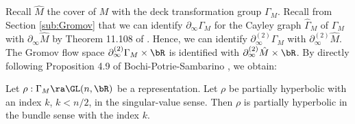 Recall $\hat M$ the cover of $M$ with the deck transformation group $\Gamma_M$. 
Recall from Section \ref{sub:Gromov}  that we can identify $\partial_\infty \Gamma_M$ for the Cayley graph $\hat \Gamma_M$ of $\Gamma_M$ with 
$\partial_\infty \hat M$ by Theorem 11.108 of \cite{DK2018}. 
Hence, we can identify $\partial_\infty^{(2)} \Gamma_M$ with $\partial^{(2)}_\infty \hat M$. 
The Gromov flow space $\partial_\infty^{(2)} \Gamma_M \times \bR$ is identified with 
$\partial^{(2)}_\infty \hat M \times \bR$. 
By directly following Proposition 4.9 of 
Bochi-Potrie-Sambarino \cite{BPS}, we obtain: 
\begin{theorem} \label{thm:bundle} 
Let $\rho: \Gamma_M \ra \GL(n, \bR)$ be a representation.
	Let $\rho$ be partially hyperbolic with an index $k$, $k < n/2$, 
	in the singular-value sense. 
	Then 
	$\rho$ is partially hyperbolic in the bundle sense with the index $k$.
\end{theorem} 
